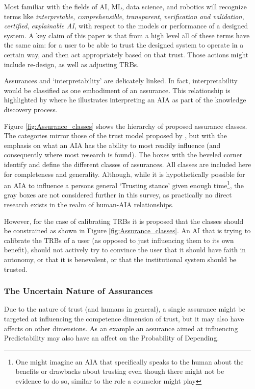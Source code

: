     Most familiar with the fields of AI, ML, data science, and robotics will recognize terms like \emph{interpretable}, \emph{comprehensible}, \emph{transparent}, \emph{verification and validation}, \emph{certified}, \emph{explainable AI}, with respect to the models or performance of a designed system. A key claim of this paper is that from a high level all of these terms have the same aim: for a user to be able to trust the designed system to operate in a certain way, and then act appropriately based on that trust. Those actions might include re-design, as well as adjusting TRBs.

    Assurances and `interpretability' are delicately linked. In fact, interpretability would be classified as one embodiment of an assurance. This relationship is highlighted by \citet{Vellido2012-nm} where he illustrates interpreting an AIA as part of the knowledge discovery process.

    Figure \ref{fig:Assurance_classes} shows the hierarchy of proposed assurance classes. The categories mirror those of the trust model proposed by \citet{McKnight2001-fa}, but with the emphasis on what an AIA has the ability to most readily influence (and consequently where most research is found). The boxes with the beveled corner identify and define the different classes of assurances. All classes are included here for completeness and generality. Although, while it is hypothetically possible for an AIA to influence a persons general `Trusting stance' given enough time\footnote{One might imagine an AIA that specifically speaks to the human about the benefits or drawbacks about trusting even though there might not be evidence to do so, similar to the role a counselor might play}, the gray boxes are not considered further in this survey, as practically no direct research exists in the realm of human-AIA relationships.

    
    
    
    

    However, for the case of calibrating TRBs it is proposed that the classes should be constrained as shown in Figure \ref{fig:Assurance_classes}. An AI that is trying to calibrate the TRBs of a user (as opposed to just influencing them to its own benefit), should not actively try to convince the user that it should have faith in autonomy, or that it is benevolent, or that the institutional system should be trusted.

    \subsubsection{The Uncertain Nature of Assurances}
        Due to the nature of trust (and humans in general), a single assurance might be targeted at influencing the competence dimension of trust, but it may also have affects on other dimensions. As an example an assurance aimed at influencing Predictability may also have an affect on the Probability of Depending.

